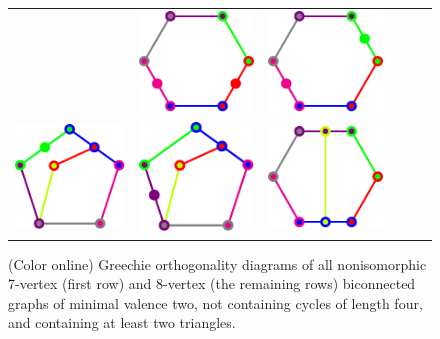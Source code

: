 \documentclass[%
 twocolumn,
 groupedaddress,
 showpacs,
 showkeys,
 preprintnumbers,
 amsmath,amssymb,
 aps,
 pra,
 longbibliography,
 floatfix,
 ]{revtex4-1}
\begin{document}
\begin{figure}
\begin{center}
\begin{tabular}{cccccc}
			&
			\includegraphics{2018-minimalYIYS_pra_15REVISEDJR-Fig2f.pdf}
			&
			\includegraphics{2018-minimalYIYS_pra_15REVISEDJR-Fig2g.pdf}
			\\
			\includegraphics{2018-minimalYIYS_pra_15REVISEDJR-Fig2h.pdf}
			&
			\includegraphics{2018-minimalYIYS_pra_15REVISEDJR-Fig2i.pdf}
			&
			\includegraphics{2018-minimalYIYS_pra_15REVISEDJR-Fig2j.pdf}
		\end{tabular}
	\end{center}
	\centering
	\caption{\label{Fig2}
	(Color online) Greechie orthogonality diagrams of all nonisomorphic 7-vertex (first row) and 8-vertex (the remaining rows)
		biconnected graphs of minimal valence two, not containing cycles of length four, and containing at least two triangles.}
\end{figure}

\end{document}
